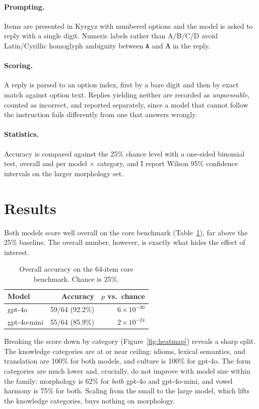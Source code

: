 \documentclass{article}
\newcommand{\ky}[1]{\foreignlanguage{russian}{#1}}
\begin{document}
\paragraph{Prompting.} Items are presented in Kyrgyz with numbered options and the
model is asked to reply with a single digit. Numeric labels rather than A/B/C/D avoid
Latin/Cyrillic homoglyph ambiguity between \texttt{A} and \ky{А} in the reply.

\paragraph{Scoring.} A reply is parsed to an option index, first by a bare digit and
then by exact match against option text. Replies yielding neither are recorded as
\emph{unparseable}, counted as incorrect, and reported separately, since a model that
cannot follow the instruction fails differently from one that answers wrongly.

\paragraph{Statistics.} Accuracy is compared against the 25\% chance level with a
one-sided binomial test, overall and per model $\times$ category, and I report Wilson
95\% confidence intervals on the larger morphology set.

\section{Results}
\label{sec:results}

Both models score well overall on the core benchmark
(Table~\ref{tab:overall}), far above the 25\% baseline. The overall number, however,
is exactly what hides the effect of interest.

\begin{table}[h]
\centering
\small
\begin{tabular}{lrr}
\toprule
Model & Accuracy & $p$ vs.\ chance \\
\midrule
gpt-4o       & 59/64 (92.2\%) & $6\times10^{-30}$ \\
gpt-4o-mini  & 55/64 (85.9\%) & $2\times10^{-24}$ \\
\bottomrule
\end{tabular}
\caption{Overall accuracy on the 64-item core benchmark. Chance is 25\%.}
\label{tab:overall}
\end{table}

Breaking the score down by category (Figure~\ref{fig:heatmap}) reveals a sharp split.
The knowledge categories are at or near ceiling: idioms, lexical semantics, and
translation are 100\% for both models, and culture is 100\% for gpt-4o. The form
categories are much lower and, crucially, do not improve with model size within the
family: morphology is 62\% for \emph{both} gpt-4o and gpt-4o-mini, and vowel harmony
is 75\% for both. Scaling from the small to the large model, which lifts the knowledge
categories, buys nothing on morphology.
\end{document}
